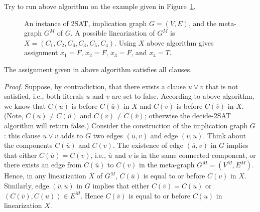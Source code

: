 \begin{algorithmblock}[0.8\textwidth]
	\xxx
	\xxx
	\xxx
	\xxx
	\xxx
	\xxx
	\xxx
\end{algorithmblock}

Try to run above algorithm on the example given in Figure~\ref{fig:instance2}.

\begin{figure}[h!]
\centering{}
\caption{An instance of 2SAT, implication graph $G = (V, E)$, and the meta-graph $G^M$ of $G$. 
A possible linearization of $G^M$ is $X = (C_1, C_2, C_6, C_3, C_5, C_4)$.
Using $X$ above algorithm gives assignment $x_1 = F$, $x_2 = F$, $x_3 = F$, and $x_4 = T$.}
\label{fig:instance2}
\end{figure}

\begin{claim}
The assignment given in above algorithm satisfies all clauses.
\end{claim}

\emph{Proof.} Suppose, by contradiction, that there exists a clause $u\vee v$ that is not satisfied,
i.e., both literals $u$ and $v$ are set to false.
According to above algorithm, we know that 
$C(u)$ is before $C(\overline{u})$ in $X$
and $C(v)$ is before $C(\overline{v})$ in $X$.
(Note, $C(u) \neq C(\overline{u})$ and $C(v) \neq C(\overline{v})$; otherwise the decide-2SAT algorithm will return false.)
Consider the construction of the implication graph $G$:
this clause $u\vee v$ adds to $G$ two edges $(\overline{u}, v)$ and edge $(\overline{v}, u)$.
Think about the components $C(\overline{u})$ and $C(v)$.
The existence of edge $(\overline{u}, v)$ in $G$ implies that 
either $C(\overline{u}) = C(v)$, i.e., $\overline{u}$ and $v$ is in the same connected component,
or there exists an edge from $C(\overline{u})$ to $C(v)$ in the meta-graph $G^M = (V^M, E^M)$.
Hence, in any linearization $X$ of $G^M$, $C(\overline{u})$ is equal to or before $C(v)$ in $X$.
Similarly, edge $(\overline{v}, u)$ in $G$ implies that 
either $C(\overline{v}) = C(u)$ or $(C(\overline{v}), C(u))\in E^M$.
Hence $C(\overline{v})$ is equal to or before $C(u)$ in linearization $X$.

